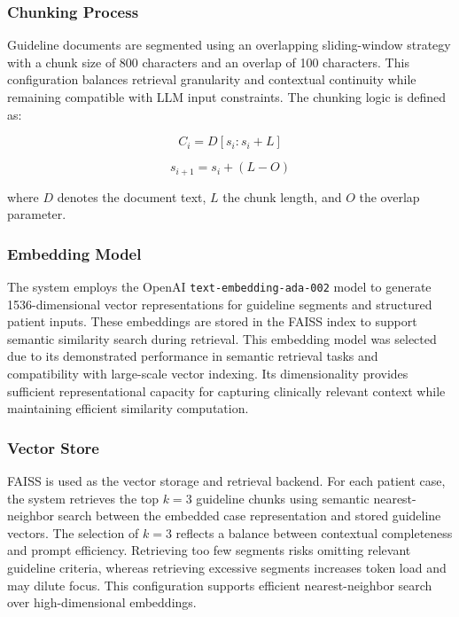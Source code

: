 \documentclass[preprint,12pt]{elsarticle}
\begin{document}
\subsubsection{Chunking Process}

Guideline documents are segmented using an overlapping sliding-window strategy with a chunk size of 800 characters and an overlap of 100 characters.  This configuration balances retrieval granularity and contextual continuity while remaining compatible with LLM input constraints. The chunking logic is defined as:

\begin{equation}
C_i = D[s_i : s_i + L]
\end{equation}

\begin{equation}
s_{i+1} = s_i + (L - O)
\end{equation}

where \(D\) denotes the document text, \(L\) the chunk length, and \(O\) the overlap parameter.


\subsubsection{Embedding Model}
The system employs the OpenAI \texttt{text-embedding-ada-002} model to generate 1536-dimensional vector representations for guideline segments and structured patient inputs. These embeddings are stored in the FAISS index to support semantic similarity search during retrieval. This embedding model was selected due to its demonstrated performance in semantic retrieval tasks and compatibility with large-scale vector indexing. Its dimensionality provides sufficient representational capacity for capturing clinically relevant context while maintaining efficient similarity computation.


\subsubsection{Vector Store}
FAISS is used as the vector storage and retrieval backend. For each patient case, the system retrieves the top \(k = 3\) guideline chunks using semantic nearest-neighbor search between the embedded case representation and stored guideline vectors. The selection of \(k = 3\) reflects a balance between contextual completeness and prompt efficiency. Retrieving too few segments risks omitting relevant guideline criteria, whereas retrieving excessive segments increases token load and may dilute focus. This configuration supports efficient nearest-neighbor search over high-dimensional embeddings.
\end{document}
